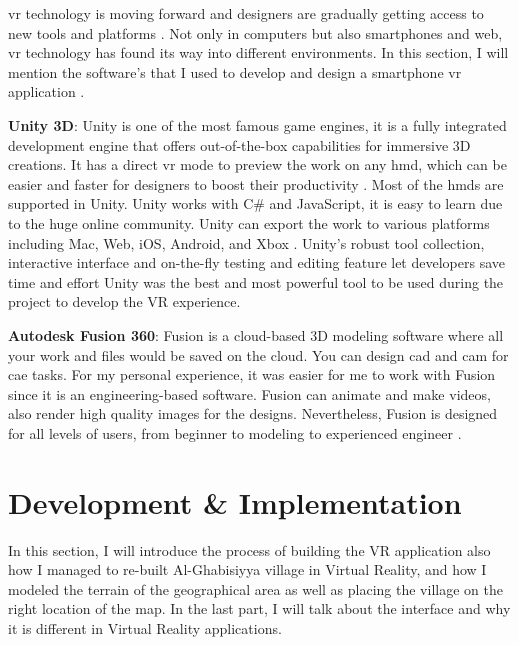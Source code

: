\acrshort{vr} technology is moving forward and designers are gradually getting access to new tools and platforms \citep{Bamodu2013VirtualComponents}. Not only in computers but also smartphones and web, \acrshort{vr} technology has found its way into different environments. In this section, I will mention the software's that I used to develop and design a smartphone \acrshort{vr} application . 


\textbf{Unity 3D}: Unity is one of the most famous game engines, it is a  fully integrated development engine that offers out-of-the-box capabilities for immersive 3D creations. It has a direct \acrshort{vr} mode to preview the work on any \acrlong{hmd}, which can be easier and faster for designers to boost their productivity \citep{Kim2014UsingDevelopment}. Most of the \acrlong{hmd}s are supported in Unity. Unity works with C\# and JavaScript, it is easy to learn due to the huge online community. Unity can export the work to various platforms including Mac, Web, iOS, Android, and Xbox \citep{Kim2014UsingDevelopment}. Unity's robust tool collection, interactive interface and on-the-fly testing and editing feature let developers save time and effort Unity was the best and most powerful tool to be used during the project to develop the VR experience.

\textbf{Autodesk Fusion 360}: Fusion is a cloud-based 3D modeling software where all your work and files would be saved on the cloud. You can design \acrfull{cad} and \acrfull{cam} for \acrfull{cae} tasks. For my personal experience, it was easier for me to work with Fusion since it is an engineering-based software.  Fusion can animate and make videos, also render high quality images for the designs. Nevertheless, Fusion is designed for all levels of users, from beginner to modeling to experienced engineer \citep{Cline2018FusionFabrication}. 

\section{Development \& Implementation}

In this section, I will introduce the process of building the VR application  also how I managed to re-built Al-Ghabisiyya village in Virtual Reality, and how I modeled the terrain of the geographical area as well as placing the village on the right location of the map. In the last part, I will talk about the interface and why it is different in Virtual Reality applications. 


